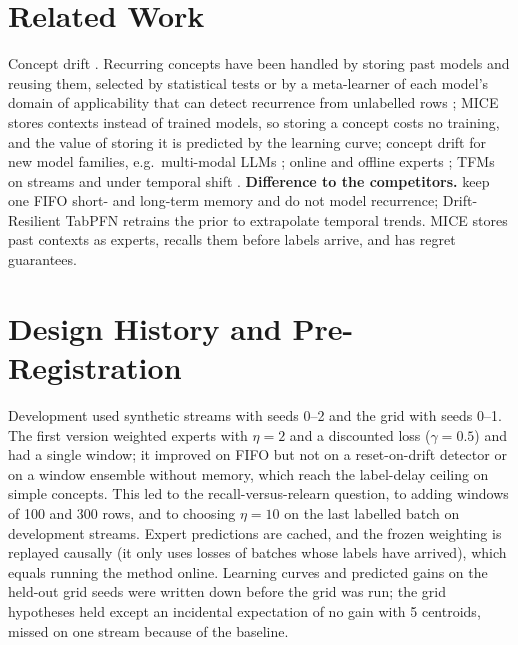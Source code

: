 \documentclass{article}
\theoremstyle{plain}
\theoremstyle{definition}
\theoremstyle{remark}
\newcommand{\method}{\textsc{MICE}}   %
\begin{document}
\section{Related Work}
Concept drift \citep{gama2014survey,lu2019learning}. Recurring concepts have been handled by storing past models and
reusing them, selected by statistical tests \citep{goncalves2013rcd} or by a meta-learner of each model's domain of
applicability that can detect recurrence from unlabelled rows \citep{gama2014recurrent}; \method{} stores contexts
instead of trained models, so storing a concept costs no training, and the value of storing it is predicted by the
learning curve; concept drift for new model families,
e.g.\ multi-modal LLMs \citep{yang2025adapting,yang2026turning}; online and offline experts
\citep{zhao2025mooe}; TFMs on streams and under temporal shift \citep{lourenco2026streams,helli2024drift}.
\textbf{Difference to the competitors.} \citet{lourenco2026streams} keep one FIFO short- and long-term memory and do
not model recurrence; Drift-Resilient TabPFN retrains the prior to extrapolate temporal trends. \method{} stores past
contexts as experts, recalls them before labels arrive, and has regret guarantees.


\appendix
\section{Design History and Pre-Registration}
\label{app:history}
Development used synthetic streams with seeds 0--2 and the grid with seeds 0--1. The first version weighted experts
with $\eta=2$ and a discounted loss ($\gamma=0.5$) and had a single window; it improved on FIFO but not on a
reset-on-drift detector or on a window ensemble without memory, which reach the label-delay ceiling on simple concepts.
This led to the recall-versus-relearn question, to adding windows of 100 and 300 rows, and to choosing $\eta=10$ on
the last labelled batch on development streams. Expert predictions are cached, and the frozen weighting is replayed
causally (it only uses losses of batches whose labels have arrived), which equals running the method online. Learning
curves and predicted gains on the held-out grid seeds were written down before the grid was run; the grid hypotheses
held except an incidental expectation of no gain with 5 centroids, missed on one stream because of the baseline.



\end{document}
